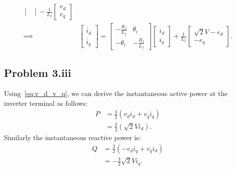 \begin{align}
\begin{bmatrix}
	\end{bmatrix}-\frac{1}{L_f}\begin{bmatrix}
		e_d\\e_q
	\end{bmatrix} \nonumber\\
	\implies & \begin{bmatrix}
	\dot{i_d}\\ \dot{i_q}
	\end{bmatrix} = \begin{bmatrix}
		-\frac{R_f}{L_f} & \dot{\theta_i}\\
		-\dot{\theta_i} & -\frac{R_f}{L_f}
	\end{bmatrix} \begin{bmatrix}
		i_d\\i_q
	\end{bmatrix} + \frac{1}{L_f}\begin{bmatrix}
		\sqrt{2}V-e_d\\-e_q
	\end{bmatrix}.
\end{align}
\subsection*{Problem 3.iii}
Using~\ref{eq:v_d_v_q}, we can derive the instantaneous active power at the inverter terminal as follows:
\begin{align}
	P &= \frac{3}{2}(v_di_d+v_qi_q) \nonumber\\
	&= \frac{3}{2}(\sqrt{2}Vi_d).
\end{align}
Similarly the instantaneous reactive power is:
\begin{align*}
	Q &= \frac{3}{2}(-v_di_q+v_qi_d) \nonumber\\
	&= -\frac{3}{2}\sqrt{2}Vi_q.
\end{align*}
